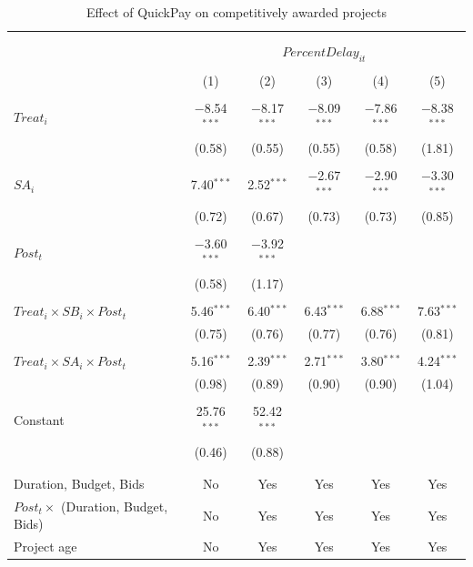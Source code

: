 \documentclass[]{article}
\begin{document}
\begin{table}[H] \centering 
  \caption{Effect of QuickPay on competitively awarded projects} 
  \label{} 
\small 
\begin{tabular}{@{\extracolsep{-2pt}}lccccc} 
\\[-1.8ex]\hline 
\hline \\[-1.8ex] 
\\[-1.8ex] & \multicolumn{5}{c}{$PercentDelay_{it}$  } \\ 
\\[-1.8ex] & (1) & (2) & (3) & (4) & (5)\\ 
\hline \\[-1.8ex] 
 $Treat_i$ & $-$8.54$^{***}$ & $-$8.17$^{***}$ & $-$8.09$^{***}$ & $-$7.86$^{***}$ & $-$8.38$^{***}$ \\ 
  & (0.58) & (0.55) & (0.55) & (0.58) & (1.81) \\ 
  & & & & & \\ 
 $SA_i$ & 7.40$^{***}$ & 2.52$^{***}$ & $-$2.67$^{***}$ & $-$2.90$^{***}$ & $-$3.30$^{***}$ \\ 
  & (0.72) & (0.67) & (0.73) & (0.73) & (0.85) \\ 
  & & & & & \\ 
 $Post_t$ & $-$3.60$^{***}$ & $-$3.92$^{***}$ &  &  &  \\ 
  & (0.58) & (1.17) &  &  &  \\ 
  & & & & & \\ 
 $Treat_i \times SB_i \times Post_t$ & 5.46$^{***}$ & 6.40$^{***}$ & 6.43$^{***}$ & 6.88$^{***}$ & 7.63$^{***}$ \\ 
  & (0.75) & (0.76) & (0.77) & (0.76) & (0.81) \\ 
  & & & & & \\ 
 $Treat_i \times SA_i \times Post_t$ & 5.16$^{***}$ & 2.39$^{***}$ & 2.71$^{***}$ & 3.80$^{***}$ & 4.24$^{***}$ \\ 
  & (0.98) & (0.89) & (0.90) & (0.90) & (1.04) \\ 
  & & & & & \\ 
 Constant & 25.76$^{***}$ & 52.42$^{***}$ &  &  &  \\ 
  & (0.46) & (0.88) &  &  &  \\ 
  & & & & & \\ 
\hline \\[-1.8ex] 
Duration, Budget, Bids & No & Yes & Yes & Yes & Yes \\ 
$Post_t \times $  (Duration, Budget, Bids) & No & Yes & Yes & Yes & Yes \\ 
Project age & No & Yes & Yes & Yes & Yes \\ 

\end{tabular}
\end{table}
\end{document}
